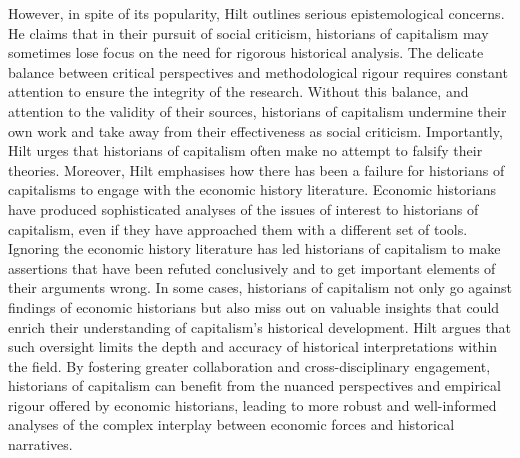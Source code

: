 \documentclass[11pt]{article}
\newcommand{\bb}{\bigbreak\noindent}
\begin{document}
\begin{spacing}{1.7}
		\bb
		However, in spite of its popularity, Hilt outlines serious epistemological concerns. He claims that in their pursuit of social criticism, historians of capitalism may sometimes lose focus on the need for rigorous historical analysis. The delicate balance between critical perspectives and methodological rigour requires constant attention to ensure the integrity of the research. Without this balance, and attention to the validity of their sources, historians of capitalism undermine their own work and take away from their effectiveness as social criticism. Importantly, Hilt urges that historians of capitalism often make no attempt to falsify their theories.  
		\bb
		Moreover, Hilt emphasises how there has been a failure for historians of capitalisms to engage with the economic history literature. Economic historians have produced sophisticated analyses of the issues of interest to historians of capitalism, even if they have approached them with a different set of tools. Ignoring the economic history literature has led historians of capitalism to make assertions that have been refuted conclusively and to get important elements of their arguments wrong. In some cases, historians of capitalism not only go against findings of economic historians but also miss out on valuable insights that could enrich their understanding of capitalism's historical development. Hilt argues that such oversight limits the depth and accuracy of historical interpretations within the field. By fostering greater collaboration and cross-disciplinary engagement, historians of capitalism can benefit from the nuanced perspectives and empirical rigour offered by economic historians, leading to more robust and well-informed analyses of the complex interplay between economic forces and historical narratives. 
		
		

\end{spacing}
\end{document}
